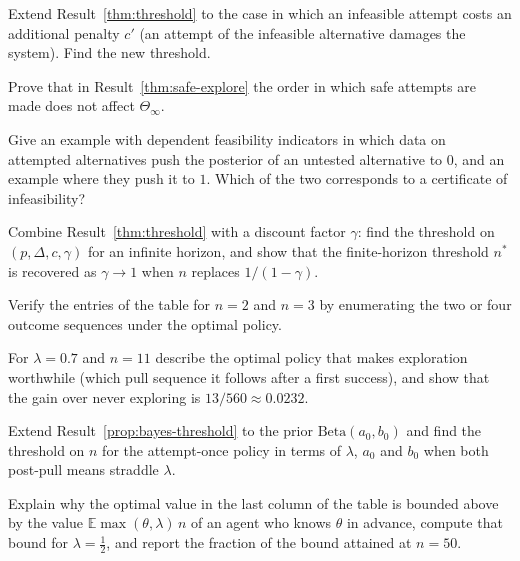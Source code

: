 \begin{exercise}
Extend Result~\ref{thm:threshold} to the case in which an infeasible attempt costs an additional penalty $c'$ (an attempt of the infeasible alternative damages the system). Find the new threshold.
\end{exercise}

\begin{exercise}
Prove that in Result~\ref{thm:safe-explore} the order in which safe attempts are made does not affect $\Theta_\infty$.
\end{exercise}

\begin{exercise}
Give an example with dependent feasibility indicators in which data on attempted alternatives push the posterior of an untested alternative to $0$, and an example where they push it to $1$. Which of the two corresponds to a certificate of infeasibility?
\end{exercise}

\begin{exercise}
Combine Result~\ref{thm:threshold} with a discount factor $\gamma$: find the threshold on $(p,\Delta,c,\gamma)$ for an infinite horizon, and show that the finite-horizon threshold $n^*$ is recovered as $\gamma\to1$ when $n$ replaces $1/(1-\gamma)$.
\end{exercise}

\begin{exercise}
Verify the entries of the table for $n=2$ and $n=3$ by enumerating the two or four outcome sequences under the optimal policy.
\end{exercise}

\begin{exercise}
For $\lambda=0.7$ and $n=11$ describe the optimal policy that makes exploration worthwhile (which pull sequence it follows after a first success), and show that the gain over never exploring is $13/560\approx0.0232$.\label{ex2:bandit-11}
\end{exercise}

\begin{exercise}
Extend Result~\ref{prop:bayes-threshold} to the prior $\mathrm{Beta}(a_0,b_0)$ and find the threshold on $n$ for the attempt-once policy in terms of $\lambda$, $a_0$ and $b_0$ when both post-pull means straddle $\lambda$.
\end{exercise}

\begin{exercise}
Explain why the optimal value in the last column of the table is bounded above by the value $\mathbb E\max(\theta,\lambda)\,n$ of an agent who knows $\theta$ in advance, compute that bound for $\lambda=\tfrac12$, and report the fraction of the bound attained at $n=50$.\label{ex2:oracle-bound}
\end{exercise}

